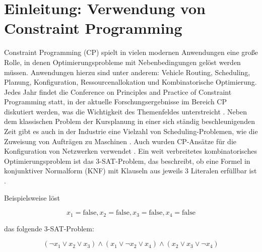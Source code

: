 





\tableofcontents

\clearpage
{}


\section{Einleitung: Verwendung von Constraint Programming}
\label{sec:Einleitung-Verwendung-von-Constraint-Programming}

Constraint Programming (CP) spielt in vielen modernen Anwendungen eine große
Rolle, in denen Optimierungsprobleme mit Nebenbedingungen gelöst werden müssen.
Anwendungen hierzu sind unter anderem: Vehicle Routing, Scheduling, Planung,
Konfiguration, Ressourcenallokation und Kombinatorische Optimierung. Jedes Jahr
findet die Conference on Principles and Practice of Constraint Programming
statt, in der aktuelle Forschungsergebnisse im Bereich CP diskutiert werden, was
die Wichtigkeit des Themenfeldes unterstreicht \cite{CP20we}. Neben dem
klassischen Problem der Kursplanung \cite{duboi96jo} in einer sich ständig
beschleunigenden Zeit gibt es auch in der Industrie eine Vielzahl von
Scheduling-Problemen, wie die Zuweisung von Aufträgen zu Maschinen
\cite{gedik16jo}. Auch wurden CP-Ansätze für die Konfiguration von Netzwerken
verwendet \cite{ardisjo}. Ein weit verbreitetes kombinatorisches
Optimierungsproblem ist das 3-SAT-Problem, das beschreibt, ob eine Formel in
konjunktiver Normalform (KNF) mit Klauseln aus jeweils 3 Literalen erfüllbar ist
\cite[271]{rossi06bo}. 

Beispielsweise löst

\[ x_1=\text{false}, x_2=\text{false}, x_3=\text{false}, x_4=\text{false} \]

das folgende 3-SAT-Problem:

\[ (\lnot x_1 \lor x_2 \lor x_3) \land (x_1 \lor \lnot x_2 \lor x_4) \land (x_2
\lor x_3 \lor \lnot x_4) \]

